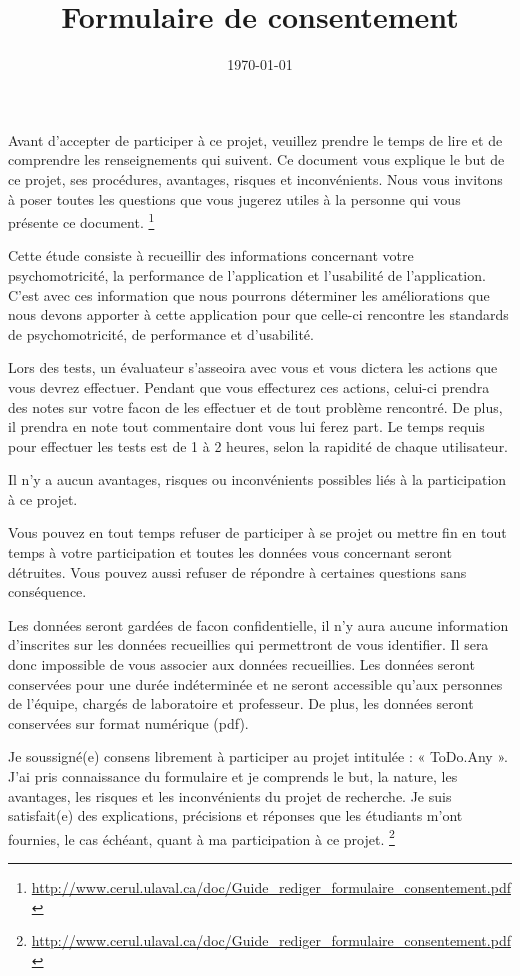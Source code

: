 \documentclass[12pt,a4paper,oneside]{article}
\begin{document}
\title{Formulaire de consentement}
\date{\today}
\maketitle

Avant d’accepter de participer à ce projet, veuillez prendre le temps de lire et de comprendre les renseignements qui suivent. Ce document vous explique le but de ce projet, ses procédures, avantages, risques et inconvénients. Nous vous invitons à poser toutes les questions que vous jugerez utiles à la personne qui vous présente ce document. \footnote{\url{http://www.cerul.ulaval.ca/doc/Guide_rediger_formulaire_consentement.pdf}}

Cette étude consiste à recueillir des informations concernant votre psychomotricité, la performance de l'application et l'usabilité de l'application. C'est avec ces information que nous pourrons déterminer les améliorations que nous devons apporter à cette application pour que celle-ci rencontre les standards de psychomotricité, de performance et d'usabilité.

Lors des tests, un évaluateur s'asseoira avec vous et vous dictera les actions que vous devrez effectuer. Pendant que vous effecturez ces actions, celui-ci prendra des notes sur votre facon de les effectuer et de tout problème rencontré. De plus, il prendra en note tout commentaire dont vous lui ferez part. Le temps requis pour effectuer les tests est de 1 à 2 heures, selon la rapidité de chaque utilisateur.

Il n'y a aucun avantages, risques ou inconvénients possibles liés à la participation à ce projet.

Vous pouvez en tout temps refuser de participer à se projet ou mettre fin en tout temps à votre participation et toutes les données vous concernant seront détruites. Vous pouvez aussi refuser de répondre à certaines questions sans conséquence.

Les données seront gardées de facon confidentielle, il n'y aura aucune information d'inscrites sur les données recueillies qui permettront de vous identifier. Il sera donc impossible de vous associer aux données recueillies. Les données seront conservées pour une durée indéterminée et ne seront accessible qu'aux personnes de l'équipe, chargés de laboratoire et professeur. De plus, les données seront conservées sur format numérique (pdf).

\newpage

Je soussigné(e) \underline{\hspace{4.5cm}} consens librement à participer au projet intitulée : « ToDo.Any ». J’ai pris connaissance du formulaire et je comprends le but, la nature, les avantages, les risques et les inconvénients du projet de recherche. Je suis satisfait(e) des explications, précisions et réponses que les étudiants m’ont fournies, le cas échéant, quant à ma participation à ce projet. \footnote{\url{http://www.cerul.ulaval.ca/doc/Guide_rediger_formulaire_consentement.pdf}}
\end{document}
